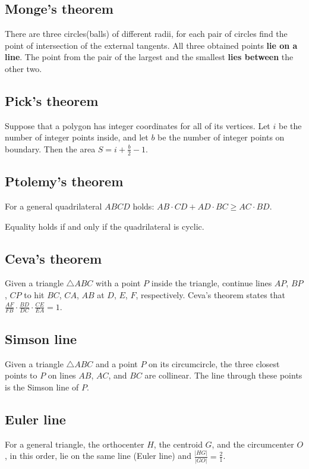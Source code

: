 \subsection{Monge's theorem}
There are three circles(balls) of different radii, 
for each pair of circles find the point of intersection of the external tangents. 
All three obtained points \textbf{lie on a line}. 
The point from the pair of the largest and the smallest \textbf{lies between} the other two.

\subsection{Pick's theorem}
Suppose that a polygon has integer coordinates for all of its vertices. 
Let $i$ be the number of integer points inside, and let $b$ be the number of integer points on boundary. 
Then the area $S = i + \tfrac{b}{2} - 1$.

\subsection{Ptolemy's theorem}
For a general quadrilateral $ABCD$ holds:
$AB \cdot CD + AD \cdot BC \ge AC \cdot BD$.

Equality holds if and only if the quadrilateral is cyclic.

\subsection{Ceva's theorem}
Given a triangle $\triangle ABC$ with a point $P$ inside the triangle,
continue lines $AP$, $BP$, $CP$ to hit $BC$, $CA$, $AB$ at $D$, $E$, $F$,
respectively.
Ceva's theorem states that
$\frac{AF}{FB} \cdot \frac{BD}{DC} \cdot \frac{CE}{EA} = 1$. 

\subsection{Simson line}
Given a triangle $\triangle ABC$ and a point $P$ on its circumcircle,
the three closest points to $P$ on lines $AB$, $AC$, and $BC$ are collinear.
The line through these points is the Simson line of $P$.

\subsection{Euler line}
For a general triangle, the orthocenter $H$, the centroid $G$, 
and the circumcenter $O$, in this order, lie on the same line (Euler line) 
and $\frac{|HG|}{|GO|} = \frac{2}{1}$.

